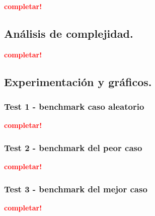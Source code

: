 \textcolor{red}{\textbf{completar!}}



\newpage
\subsection{Análisis de complejidad.}

\vspace*{0.3cm}

\textcolor{red}{\textbf{completar!}}



\newpage
\subsection{Experimentación y gráficos.}

\vspace*{0.3cm}

\subsubsection{Test 1 - benchmark caso aleatorio}

\textcolor{red}{\textbf{completar!}}


\newpage
\subsubsection{Test 2 - benchmark del peor caso}

\textcolor{red}{\textbf{completar!}}


\newpage
\subsubsection{Test 3 - benchmark del mejor caso}

\textcolor{red}{\textbf{completar!}}
